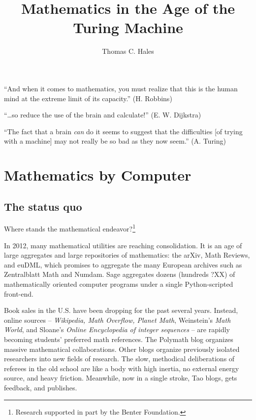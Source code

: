 \documentclass{llncs}
\begin{document}
\title{Mathematics in the Age of the Turing Machine}
\author{Thomas C. Hales}
\maketitle


\section*{}

{

\narrower

\it

``And when it comes to mathematics, you must realize that this is the human mind
at the extreme limit of its capacity.'' (H. Robbins) 

\smallskip
\noindent
``\ldots so reduce the use of
the brain and calculate!'' (E. W. Dijkstra)  

\smallskip
\noindent
``The fact that a brain {\it can} do it seems to suggest that the
difficulties [of trying with a machine] may not really be so bad as they now
seem.''  (A. Turing)

}


\section{Mathematics by Computer}

\subsection{The status quo}

Where stands the mathematical endeavor?\footnote{Research supported in part by the Benter Foundation.}

In 2012, many mathematical utilities are reaching consolidation.  It
is an age of large aggregates and large repositories of mathematics:
the arXiv, Math Reviews, and euDML, which promises to aggregate the
many European archives such as Zentralblatt Math and Numdam.  Sage
aggregates dozens (hundreds ?XX) of mathematically oriented computer
programs under a single Python-scripted front-end.


Book sales in the U.S. have been dropping  for the past several years. 
Instead, online sources -- {\it Wikipedia, Math Overflow, Planet
  Math}, Weinstein's {\it Math World}, and Sloane's {\it Online
  Encyclopedia of integer sequences} -- are rapidly becoming students'
preferred math references. The Polymath blog organizes massive
mathematical collaborations.  Other blogs organize previously isolated
researchers into new fields of research.  The slow, methodical
deliberations of referees in the old school are like a body with high
inertia, no external energy source, and heavy friction.  Meanwhile,
now in a single stroke,  Tao blogs, gets feedback, and publishes.
\end{document}
